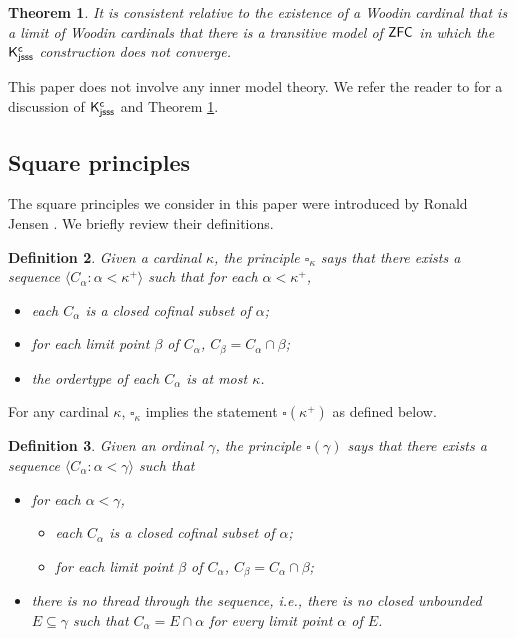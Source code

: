 \documentclass[12pt]{article}
\newtheorem{theorem}{Theorem}[section]
\newtheorem{definition}[theorem]{Definition}
\begin{document}
\begin{theorem}\label{Kc corollary} It is consistent relative to the existence of a Woodin cardinal that is a limit of Woodin cardinals that there is a transitive model of $\sf{ZFC}$ in which the $\sf{K}^c_{jsss}$ construction does not converge.
\end{theorem}

This paper does not involve any inner model theory. We refer the reader to \cite{Changmodels_1} for a discussion of $\sf{K}^c_{jsss}$ and Theorem \ref{Kc corollary}.

\subsection{Square principles}

The square principles we consider in this paper were introduced by Ronald Jensen \cite{Jensen}. We briefly review their definitions.

\begin{definition}
Given a cardinal $\kappa$, the principle $\square_{\kappa}$ says that there exists a sequence $\langle C_{\alpha} : \alpha < \kappa^{+} \rangle$ such that for each $\alpha < \kappa^{+}$,
\begin{itemize}
\item each $C_{\alpha}$ is a closed cofinal subset of $\alpha$;
\item for each limit point $\beta$ of $C_{\alpha}$, $C_{\beta} = C_{\alpha} \cap \beta$;
\item the ordertype of each $C_\alpha$ is at most $\kappa$.
\end{itemize}
\end{definition}

For any cardinal $\kappa$, $\square_{\kappa}$ implies the statement $\square(\kappa^{+})$ as defined below.



\begin{definition}
Given an ordinal $\gamma$, the principle $\square(\gamma)$ says that there exists a sequence $\langle C_{\alpha} : \alpha < \gamma \rangle$ such that
\begin{itemize}
\item for each $\alpha < \gamma$,
\begin{itemize}
\item each $C_{\alpha}$ is a closed cofinal subset of $\alpha$;
\item for each limit point $\beta$ of $C_{\alpha}$, $C_{\beta} = C_{\alpha} \cap \beta$;
\end{itemize}
\item there is no thread through the sequence, i.e., there is no closed unbounded $E \subseteq \gamma$ such that $C_{\alpha} = E \cap \alpha$ for every limit point $\alpha$ of $E$.
\end{itemize}
\end{definition}
\end{document}
